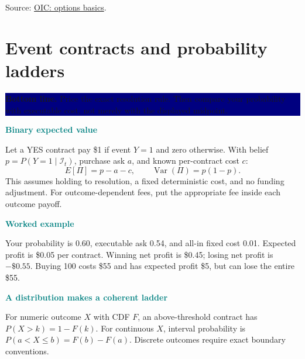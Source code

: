 \documentclass[10pt,letterpaper]{article}
\newcommand{\bl}[1]{\noindent\colorbox{navy}{\parbox{\dimexpr\linewidth-2\fboxsep}{\color{white}\textbf{Bottom line.} #1}}\par\medskip}
\newcommand{\topic}[2]{\clearpage\section{#1}\bl{#2}}
\newcommand{\sub}[1]{\par\textbf{\textcolor{teal}{#1}}\par}
\newcommand{\ex}[1]{\sub{Worked example}#1}
\newcommand{\src}[2]{\par{\footnotesize Source: \href{#1}{#2}.}}
\begin{document}
\src{https://www.optionseducation.org/optionsoverview/options-basics}{OIC: options basics}
\topic{Event contracts and probability ladders}{Price the exact resolution rule. Then compare your probability with executable cost, not merely with the displayed midpoint.}
\sub{Binary expected value}
Let a YES contract pay \$1 if event $Y=1$ and zero otherwise. With belief $p=P(Y=1\mid\mathcal I_t)$, purchase ask $a$, and known per-contract cost $c$:
\[E[\Pi]=p-a-c,\qquad \operatorname{Var}(\Pi)=p(1-p).\]
This assumes holding to resolution, a fixed deterministic cost, and no funding adjustment. For outcome-dependent fees, put the appropriate fee inside each outcome payoff.
\ex{Your probability is 0.60, executable ask 0.54, and all-in fixed cost 0.01. Expected profit is \$0.05 per contract. Winning net profit is \$0.45; losing net profit is $-\$0.55$. Buying 100 costs \$55 and has expected profit \$5, but can lose the entire \$55.}
\sub{A distribution makes a coherent ladder}
For numeric outcome $X$ with CDF $F$, an above-threshold contract has $P(X>k)=1-F(k)$. For continuous $X$, interval probability is $P(a<X\le b)=F(b)-F(a)$. Discrete outcomes require exact boundary conventions.
\end{document}
